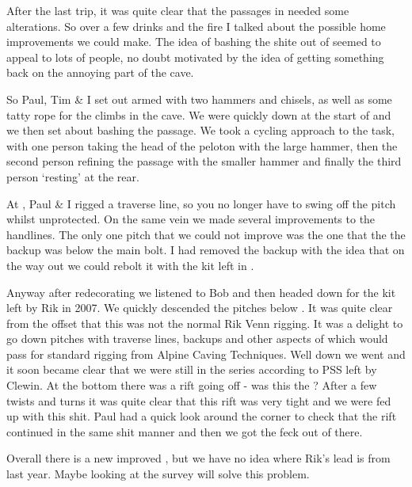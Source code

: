 After the last trip, it was quite clear that the passages in
 needed some alterations. So over a few drinks
and the fire I talked about the possible home improvements we could
make. The idea of bashing the shite out of  seemed to appeal to
lots of people, no doubt motivated by the idea of getting something back
on the annoying part of the cave.

So Paul, Tim \& I set out armed with two hammers and chisels, as well as
some tatty rope for the climbs in the cave. We were quickly down at the
start of  and we then set about bashing the
passage. We took a cycling approach to the task, with one person taking
the head of the peloton with the large hammer, then the second person
refining the passage with the smaller hammer and finally the third
person `resting' at the rear.

At , Paul \& I rigged a traverse line, so you no longer
have to swing off the pitch whilst unprotected. On the same vein we made
several improvements to the handlines. The only one pitch that we could
not improve was the one that the the backup was below the main bolt. I
had removed the backup with the idea that on the way out we could rebolt
it with the kit left in .

Anyway after redecorating  we listened to Bob and then headed
down for the kit left by Rik in 2007. We quickly descended the pitches
below . It was quite clear from the offset that
this was not the normal Rik Venn rigging. It was a delight to go down
pitches with traverse lines, backups and other aspects of which would
pass for standard rigging from Alpine Caving Techniques. Well down we
went and it soon became clear that we were still in the  series
according to PSS left by Clewin. At the bottom there was a rift going
off - was this the ? After a few twists and turns it
was quite clear that this rift was very tight and we were fed up with
this shit. Paul had a quick look around the corner to check that the
rift continued in the same shit manner and then we got the feck out of
there.

Overall there is a new improved , but we have no idea where Rik's
lead is from last year. Maybe looking at the survey will solve this
problem.

